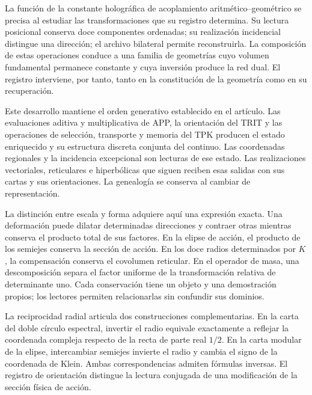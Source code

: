 \label{x_reciprocidad:rec:apertura}

La función de la constante holográfica de acoplamiento aritmético--geométrico se precisa al estudiar las transformaciones que su registro determina. Su lectura posicional conserva doce componentes ordenadas; su realización incidencial distingue una dirección; el archivo bilateral permite reconstruirla. La composición de estas operaciones conduce a una familia de geometrías cuyo volumen fundamental permanece constante y cuya inversión produce la red dual. El registro interviene, por tanto, tanto en la constitución de la geometría como en su recuperación.

Este desarrollo mantiene el orden generativo establecido en el artículo. Las evaluaciones aditiva y multiplicativa de APP, la orientación del TRIT y las operaciones de selección, transporte y memoria del TPK producen el estado enriquecido y su estructura discreta conjunta del continuo. Las coordenadas regionales y la incidencia excepcional son lecturas de ese estado. Las realizaciones vectoriales, reticulares e hiperbólicas que siguen reciben esas salidas con sus cartas y sus orientaciones. La genealogía se conserva al cambiar de representación.

La distinción entre escala y forma adquiere aquí una expresión exacta. Una deformación puede dilatar determinadas direcciones y contraer otras mientras conserva el producto total de sus factores. En la elipse de acción, el producto de los semiejes conserva la sección de acción. En los doce radios determinados por \(K\), la compensación conserva el covolumen reticular. En el operador de masa, una descomposición separa el factor uniforme de la transformación relativa de determinante uno. Cada conservación tiene un objeto y una demostración propios; los lectores permiten relacionarlas sin confundir sus dominios.

La reciprocidad radial articula dos construcciones complementarias. En la carta del doble círculo espectral, invertir el radio equivale exactamente a reflejar la coordenada compleja respecto de la recta de parte real \(1/2\). En la carta modular de la elipse, intercambiar semiejes invierte el radio y cambia el signo de la coordenada de Klein. Ambas correspondencias admiten fórmulas inversas. El registro de orientación distingue la lectura conjugada de una modificación de la sección física de acción.

